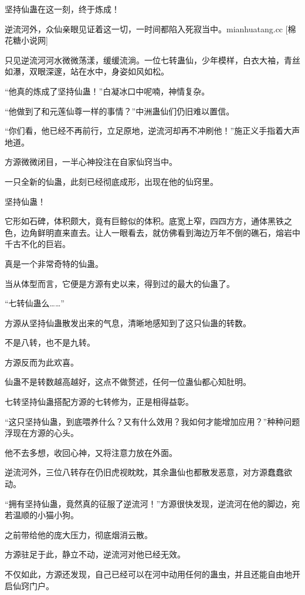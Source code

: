 
\begin{this_body}

坚持仙蛊在这一刻，终于炼成！

逆流河外，众仙亲眼见证着这一切，一时间都陷入死寂当中。mianhuatang.cc [棉花糖小说网]

只见逆流河河水微微荡漾，缓缓流淌。一位七转蛊仙，少年模样，白衣大袖，青丝如瀑，双眼深邃，站在水中，身姿如风如松。

“他真的炼成了坚持仙蛊！”白凝冰口中呢喃，神情复杂。

“他做到了和元莲仙尊一样的事情？”中洲蛊仙们仍旧难以置信。

“你们看，他已经不再前行，立足原地，逆流河却再不冲刷他！”施正义手指着大声地道。

方源微微闭目，一半心神投注在自家仙窍当中。

一只全新的仙蛊，此刻已经彻底成形，出现在他的仙窍里。

坚持仙蛊！

它形如石碑，体积颇大，竟有巨鲸似的体积。底宽上窄，四四方方，通体黑铁之色，边角鲜明直来直去。让人一眼看去，就仿佛看到海边万年不倒的礁石，熔岩中千古不化的巨岩。

真是一个非常奇特的仙蛊。

当从体型而言，它便是方源有史以来，得到过的最大的仙蛊了。

“七转仙蛊么……”

方源从坚持仙蛊散发出来的气息，清晰地感知到了这只仙蛊的转数。

不是八转，也不是九转。

方源反而为此欢喜。

仙蛊不是转数越高越好，这点不做赘述，任何一位蛊仙都心知肚明。

七转坚持仙蛊搭配方源的七转修为，正是相得益彰。

“这只坚持仙蛊，到底喂养什么？又有什么效用？我如何才能增加应用？”种种问题浮现在方源的心头。

他不去多想，收回心神，又将注意力放在外面。

逆流河外，三位八转存在仍旧虎视眈眈，其余蛊仙也都散发恶意，对方源蠢蠢欲动。

“拥有坚持仙蛊，竟然真的征服了逆流河！”方源很快发现，逆流河在他的脚边，宛若温顺的小猫小狗。

之前带给他的庞大压力，彻底烟消云散。

方源驻足于此，静立不动，逆流河对他已经无效。

不仅如此，方源还发现，自己已经可以在河中动用任何的蛊虫，并且还能自由地开启仙窍门户。


\end{this_body}
